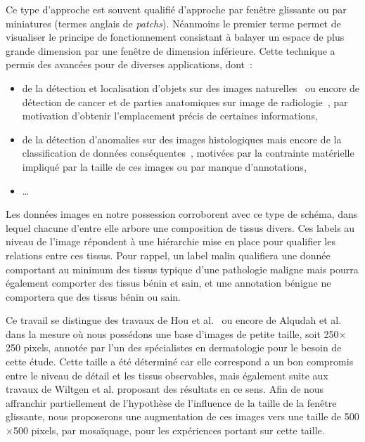 Ce type d'approche est souvent qualifié d'approche par fenêtre glissante ou par miniatures (termes anglais de \textit{patchs}). Néanmoins le premier terme permet de visualiser le principe de fonctionnement consistant à balayer un espace de plus grande dimension par une fenêtre de dimension inférieure. Cette technique a permis des avancées pour de diverses applications, dont~: 
\begin{itemize}
    \item de la détection et localisation d'objets sur des images naturelles~\cite{Harzallah2009} ou encore de détection de cancer et de parties anatomiques sur image de radiologie~\cite{Helwan2017}, par motivation d'obtenir l'emplacement précis de certaines informations,
    \item de la détection d'anomalies sur des images histologiques mais encore de la classification de données conséquentes~\cite{Hou2016,Alqudah2019,Wei2019}, motivées par la contrainte matérielle impliqué par la taille de ces images ou par manque d'annotations,
    \item \ldots
\end{itemize}\par

Les données images en notre possession corroborent avec ce type de schéma, dans lequel chacune d'entre elle arbore une composition de tissus divers. Ces labels au niveau de l'image répondent à une hiérarchie mise en place pour qualifier les relations entre ces tissus. Pour rappel, un label malin qualifiera une donnée comportant au minimum des tissus typique d'une pathologie maligne mais pourra également comporter des tissus bénin et sain, et une annotation bénigne ne comportera que des tissus bénin ou sain.\par

Ce travail se distingue des travaux de Hou et al.~\cite{Hou2016} ou encore de Alqudah et al.~\cite{Alqudah2019} dans la mesure où nous possédons une base d'images de petite taille, soit 250$\times$250 pixels, annotée par l'un des spécialistes en dermatologie pour le besoin de cette étude. Cette taille a été déterminé car elle correspond a un bon compromis entre le niveau de détail et les tissus observables, mais également suite aux travaux de Wiltgen et al.\cite{Wiltgen2008} proposant des résultats en ce sens. Afin de nous affranchir partiellement de l'hypothèse de l'influence de la taille de la fenêtre glissante, nous proposerons une augmentation de ces images vers une taille de 500$\times$500 pixels, par mosaïquage, pour les expériences portant sur cette taille.\par

